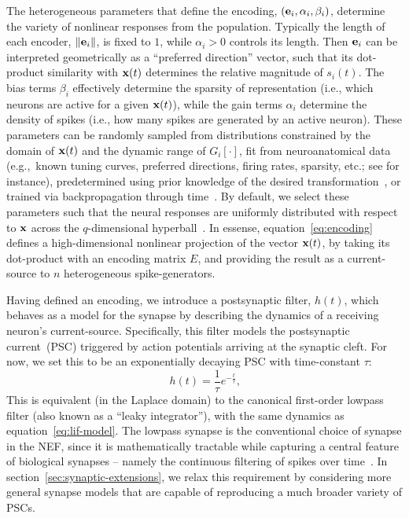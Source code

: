 The heterogeneous parameters that define the encoding, $(\mathbf{e}_i, \alpha_i, \beta_i)$, determine the variety of nonlinear responses from the population.
Typically the length of each encoder, $\| \mathbf{e}_i \|$, is fixed to $1$, while $\alpha_i > 0$ controls its length.
Then $\mathbf{e}_i$ can be interpreted geometrically as a ``preferred direction'' vector, such that its dot-product similarity with $\mathbf{x}(t)$ determines the relative magnitude of $s_i(t)$.
The bias terms $\beta_i$ effectively determine the sparsity of representation (i.e., which neurons are active for a given $\mathbf{x}(t)$), while the gain terms $\alpha_i$ determine the density of spikes (i.e., how many spikes are generated by an active neuron).
These parameters can be randomly sampled from distributions constrained by the domain of $\mathbf{x}(t)$ and the dynamic range of $G_i \left[ \cdot \right]$, fit from neuroanatomical data (e.g.,~known tuning curves, preferred directions, firing rates, sparsity, etc.; see \citet{voelker2016a} for instance), predetermined using prior knowledge of the desired transformation~\citep{jgosmann2015}, or trained via backpropagation through time~\citep[][submitted]{stockel2019align}.
By default, we select these parameters such that the neural responses are uniformly distributed with respect to $\mathbf{x}$ across the $q$-dimensional hyperball~\citep{voelker2017, gosmann2018}.
In essense, equation~\ref{eq:encoding} defines a high-dimensional nonlinear projection of the vector $\mathbf{x}(t)$, by taking its dot-product with an encoding matrix $E$, and providing the result as a current-source to $n$ heterogeneous spike-generators.

Having defined an encoding, we introduce a postsynaptic filter, $h(t)$, which behaves as a model for the synapse by describing the dynamics of a receiving neuron's current-source.
Specifically, this filter models the postsynaptic current~(PSC) triggered by action potentials arriving at the synaptic cleft.
For now, we set this to be an exponentially decaying PSC with time-constant $\tau$:
\begin{equation} \label{eq:lowpass-impulse}
h(t) = \frac{1}{\tau} e^{-\frac{t}{\tau}} \text{,}
\end{equation}
This is equivalent (in the Laplace domain) to the canonical first-order lowpass filter (also known as a ``leaky integrator''), with the same dynamics as equation~\ref{eq:lif-model}.
The lowpass synapse is the conventional choice of synapse in the NEF, since it is mathematically tractable while capturing a central feature of biological synapses -- namely the continuous filtering of spikes over time~\citep{eliasmith2003a}.
In section~\ref{sec:synaptic-extensions}, we relax this requirement by considering more general synapse models that are capable of reproducing a much broader variety of PSCs.

